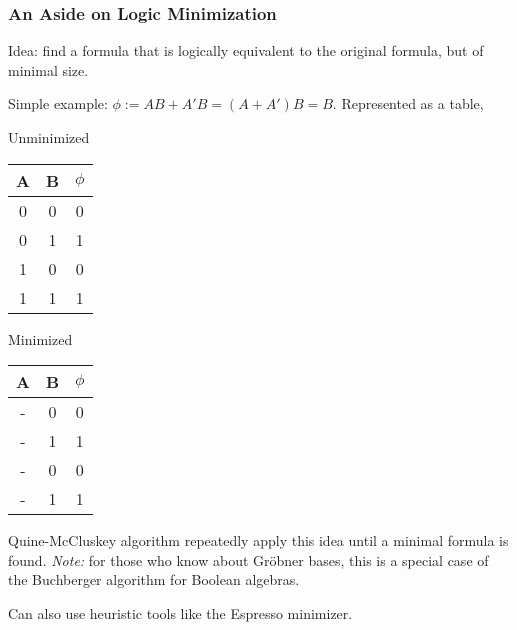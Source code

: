 \documentclass{beamer}
\begin{document}
\begin{frame}
\frametitle{An Aside on Logic Minimization}
Idea: find a formula that is logically equivalent to the original formula, but of minimal size.

Simple example: $\phi := AB + A'B = (A + A')B = B$. Represented as a table, 

\begin{center}
    Unminimized
    \begin{tabular}{|c c c|}
        \hline
        A & B & $\phi$ \\
        \hline
        0 & 0 & 0 \\
        0 & 1 & 1 \\
        1 & 0 & 0 \\
        1 & 1 & 1 \\
        \hline
    \end{tabular}
    \quad Minimized
    \begin{tabular}{|c c c|}
        \hline
        A & B & $\phi$ \\
        \hline
        - & 0 & 0 \\
        - & 1 & 1 \\
        - & 0 & 0 \\
        - & 1 & 1 \\
        \hline
    \end{tabular}
\end{center}


Quine-McCluskey algorithm repeatedly apply this idea until a minimal formula is found. \textit{Note:} for those who know about Gr\"obner bases, this is a special case of the Buchberger algorithm for Boolean algebras.

Can also use heuristic tools like the Espresso minimizer.
\end{frame}
\end{document}
